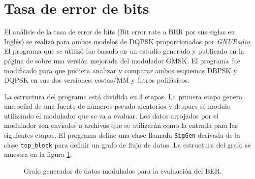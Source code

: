 \section{Tasa de error de bits}

El an\'alisis de la tasa de error de bits (Bit error rate o BER por sus siglas en Ingl\'es) se realiz\'o
para ambos modelos de DQPSK proporcionados por \emph{GNURadio}. El programa que se utiliz\'o fue
basado en un estudio generado y publicado en la p\'agina de \gnuradio sobre una versi\'on mejorada
del modulador GMSK. El programa fue modificado para que pudiera analizar y comparar ambos esquemas
DBPSK y DQPSK en sus dos versiones: costas/MM y filtros polif\'asicos.

La estructura del programa est\'a dividida en 3 etapas. La primera etapa genera una se\~nal de una
fuente de n\'umeros pseudo-aleatorios y despues se modula utilizando el modulador que se va a evaluar.
Los datos arrojados por el modulador son enviados a archivos que se utilizar\'an como la entrada para las
siguientes etapas. El programa define una clase llamada \verb|SigGen| derivada de la clase
\verb|top_block| para definir un grafo de flujo de datos. La estructura del grafo se muestra en la
figura \ref{fig:siggen}.

\begin{figure}[htp]
  \centering
  \vspace{0.3in}
  \vspace{0.3in}
  \caption{Grafo generador de datos modulados para la evaluaci\'on del BER.}
  \label{fig:siggen}
\end{figure}

